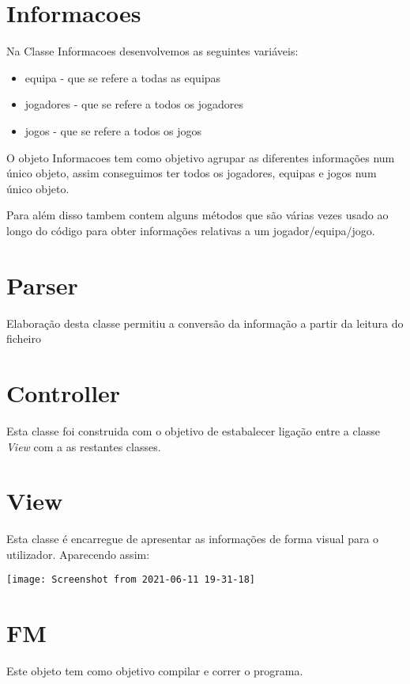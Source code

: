 \documentclass[a4paper,12pt]{article}
\begin{document}
\section{Informacoes}
    Na Classe Informacoes desenvolvemos as seguintes variáveis:
    \begin{itemize}
        \item equipa - que se refere a todas as equipas
        \item jogadores - que se refere a todos os jogadores
        \item jogos - que se refere a todos os jogos
    \end{itemize} \par
    O objeto Informacoes tem como objetivo agrupar as diferentes informações num único objeto, assim conseguimos ter
todos os jogadores, equipas e jogos num único objeto. \par
    Para além disso tambem contem alguns métodos que são várias vezes usado ao longo do código para obter informações
relativas a um jogador/equipa/jogo.

\section{Parser}
    Elaboração desta classe permitiu a conversão da informação a partir da leitura do ficheiro

\section{Controller}
    Esta classe foi construida com o objetivo de estabalecer ligação entre a classe \emph{View} com a as restantes
classes.

\newpage

\section{View}
    Esta classe é encarregue de apresentar as informações de forma visual para o utilizador.
    Aparecendo assim:
    \begin{center}
        \vspace*{1cm}
        \texttt{[image: Screenshot from 2021-06-11 19-31-18]}
    \end{center}

\section{FM}
Este objeto tem como objetivo compilar e correr o programa.\par
\end{document}
